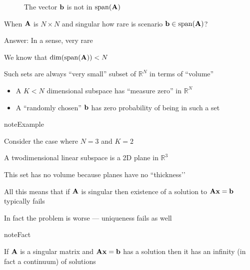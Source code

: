 \documentclass[letterpaper,10pt,english]{jupyterBook}
\begin{document}
\begin{figure}[htbp]
\centering
\capstart

\noindent{}
\caption{The vector \({\bf b}\) is not in \(\mathrm{span}({\bf A})\)}\label{\detokenize{05.linear_algebra:id16}}\end{figure}

\sphinxAtStartPar
When \({\bf A}\) is \(N \times N\) and singular how rare is scenario \({\bf b} \in
\mathrm{span}({\bf A})\)?

\sphinxAtStartPar
Answer: In a sense, very rare

\sphinxAtStartPar
We know that \(\dim(\mathrm{span}({\bf A})) < N\)

\sphinxAtStartPar
Such sets are always “very small” subset of \(\mathbb{R}^N\) in terms of “volume”
\begin{itemize}
\item {} 
\sphinxAtStartPar
A \(K < N\) dimensional subspace has “measure zero” in \(\mathbb{R}^N\)

\item {} 
\sphinxAtStartPar
A “randomly chosen” \({\bf b}\) has zero probability of being in such
a set

\end{itemize}

\begin{sphinxadmonition}{note}{Example}

\sphinxAtStartPar
Consider the case where \(N = 3\) and \(K=2\)
\end{sphinxadmonition}

\sphinxAtStartPar
A two\sphinxhyphen{}dimensional linear subspace is a 2D plane in \(\mathbb{R}^3\)

\sphinxAtStartPar
This set has no volume because planes have no ``thickness’’

\sphinxAtStartPar
All this means that if \({\bf A}\) is singular then existence
of a solution to \({\bf A} {\bf x} = {\bf b}\) typically fails

\sphinxAtStartPar
In fact the problem is worse — uniqueness fails as well

\begin{sphinxadmonition}{note}{Fact}

\sphinxAtStartPar
If \({\bf A}\) is a singular matrix and \({\bf A} {\bf x} = {\bf b}\) has a
solution then it has an infinity (in fact a continuum) of solutions
\end{sphinxadmonition}
\end{document}
